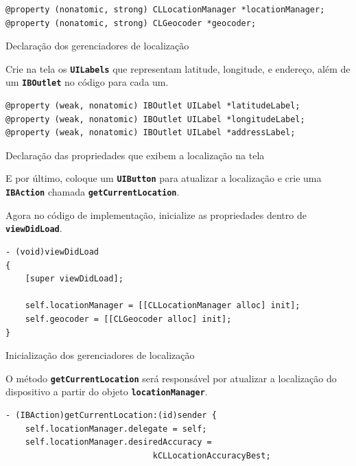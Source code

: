 \documentclass[a4paper,12pt,brazil,doubleside]{book}
\begin{document}
\begin{singlespace}
\begin{listing}[H]
\begin{verbatim}
@property (nonatomic, strong) CLLocationManager *locationManager;
@property (nonatomic, strong) CLGeocoder *geocoder;
\end{verbatim}
\caption{Declaração dos gerenciadores de localização}
\end{listing}


Crie na tela os \texttt{\textbf{UILabels}} que representam latitude, longitude, e endereço, além de um \texttt{\textbf{IBOutlet}} no código para cada um.

\begin{listing}[H]
\begin{verbatim}
@property (weak, nonatomic) IBOutlet UILabel *latitudeLabel;
@property (weak, nonatomic) IBOutlet UILabel *longitudeLabel;
@property (weak, nonatomic) IBOutlet UILabel *addressLabel;
\end{verbatim}
\caption{Declaração das propriedades que exibem a localização na tela}
\end{listing}


E por último, coloque um \texttt{\textbf{UIButton}} para atualizar a localização e crie uma \texttt{\textbf{IBAction}} chamada \texttt{\textbf{getCurrentLocation}}.

Agora no código de implementação, inicialize as propriedades dentro de \texttt{\textbf{viewDidLoad}}.

\begin{listing}[H]
\begin{verbatim}
- (void)viewDidLoad
{
    [super viewDidLoad];
    
    self.locationManager = [[CLLocationManager alloc] init];
    self.geocoder = [[CLGeocoder alloc] init];
}
\end{verbatim}
\caption{Inicialização dos gerenciadores de localização}
\end{listing}


O método \texttt{\textbf{getCurrentLocation}} será responsável por atualizar a localização do dispositivo a partir do objeto \texttt{\textbf{locationManager}}.

\begin{listing}[H]
\begin{verbatim}
- (IBAction)getCurrentLocation:(id)sender {
    self.locationManager.delegate = self;
    self.locationManager.desiredAccuracy =
                              kCLLocationAccuracyBest;
    

\end{verbatim}
\end{listing}
\end{singlespace}
\end{document}

